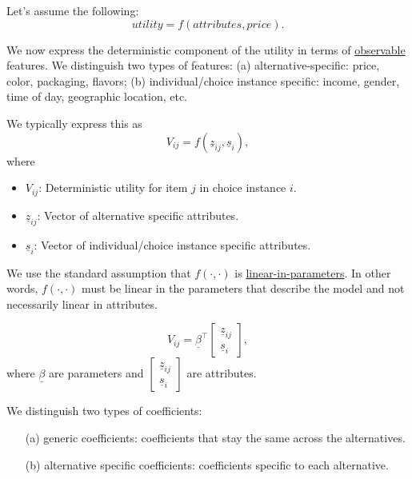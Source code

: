 \documentclass[11pt]{article}
\begin{document}
Let's assume the following:
\begin{equation}
utility = f(attributes,price).
\end{equation}

We now express the deterministic component of the utility in terms of \underline{observable} features. We distinguish two types of features: (a) alternative-specific: price, color, packaging, flavors; (b) individual/choice instance specific: income, gender, time of day, geographic location, etc.

We typically express this as
\begin{equation}
V_{ij}=f(\underline{z}_{ij},\underline{s}_i),
\end{equation} 
where 
\begin{itemize}
	\item $V_{ij}$: Deterministic utility for item $j$ in choice instance $i$.
	\item $\underline{z}_{ij}$: Vector of alternative specific attributes.
	\item $\underline{s}_i$: Vector of individual/choice instance specific attributes.
\end{itemize}

We use the standard assumption that $f(\cdot,\cdot)$ is \underline{linear-in-parameters}. In other words, $f(\cdot,\cdot)$ must be linear in the parameters that describe the model and not necessarily linear in attributes. 

\begin{equation}
V_{ij} = \underline{\beta}^\intercal \begin{bmatrix}
\underline{z}_{ij}\\
\underline{s}_i
\end{bmatrix},
\end{equation}
where $\underline{\beta}$ are parameters and $\begin{bmatrix}
\underline{z}_{ij}\\
\underline{s}_i
\end{bmatrix}$ are attributes.

We distinguish two types of coefficients:
\begin{enumerate}
	\item[(a)] generic coefficients: coefficients that stay the same across the alternatives.
	\item[(b)] alternative specific coefficients: coefficients specific to each alternative.
\end{enumerate}
\end{document}
